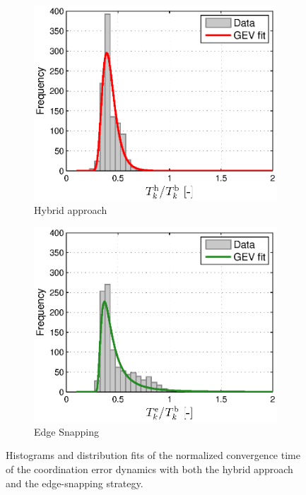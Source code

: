 \documentclass[letter,onecolumn,12pt]{aiaa-tc}
\newcommand{\1}{1_n}
\begin{document}
\begin{figure}[h]
        \centering
        \begin{subfigure}[b]{0.45\textwidth}
                \centering
                \includegraphics[width=\textwidth]{figures/CPF/Scen2_cpfMC_histHY.eps}
                \caption{Hybrid approach}
        \end{subfigure}%
        \hspace{5mm}
        \begin{subfigure}[b]{0.45\textwidth}
                \centering
                \includegraphics[width=\textwidth]{figures/CPF/Scen2_cpfMC_histES.eps}
                \caption{Edge Snapping}
        \end{subfigure}%
        \vspace{2mm}
        \caption[Histograms and distribution fits of the normalized convergence time.]{Histograms and distribution fits of the normalized convergence time of the coordination error dynamics with both the hybrid approach and the edge-snapping strategy.}
        \label{fig:tccLC.MCruns.hist}
        \vspace{6mm}
\end{figure}
\end{document}
